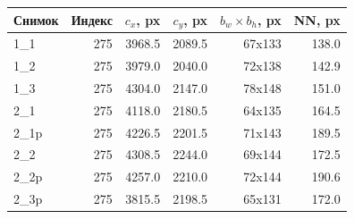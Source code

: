 \begin{tabular}{@{}lrrrrr@{}}
\toprule
Снимок & Индекс & $c_x$, px & $c_y$, px & $b_w \times b_h$, px & NN, px \\
\midrule
1\_1 & 275 & \num{3968.5} & \num{2089.5} & 67x133 & \num{138.0} \\
1\_2 & 275 & \num{3979.0} & \num{2040.0} & 72x138 & \num{142.9} \\
1\_3 & 275 & \num{4304.0} & \num{2147.0} & 78x148 & \num{151.0} \\
2\_1 & 275 & \num{4118.0} & \num{2180.5} & 64x135 & \num{164.5} \\
2\_1p & 275 & \num{4226.5} & \num{2201.5} & 71x143 & \num{189.5} \\
2\_2 & 275 & \num{4308.5} & \num{2244.0} & 69x144 & \num{172.5} \\
2\_2p & 275 & \num{4257.0} & \num{2210.0} & 72x144 & \num{190.6} \\
2\_3p & 275 & \num{3815.5} & \num{2198.5} & 65x131 & \num{172.0} \\
\bottomrule
\end{tabular}
